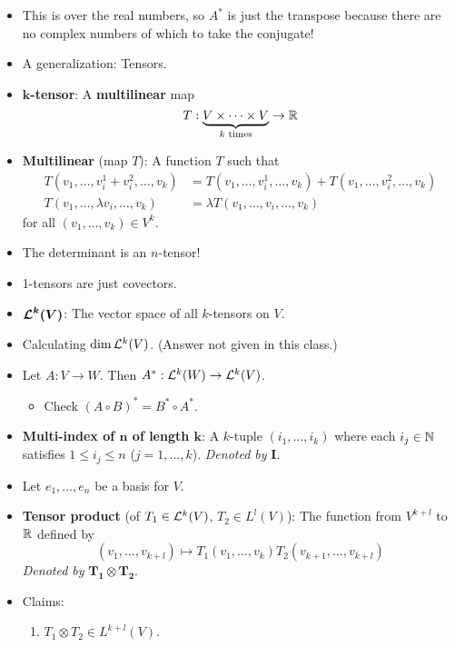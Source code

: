 \documentclass[../notes.tex]{subfiles}
\begin{document}
\begin{itemize}
    \item This is over the real numbers, so $A^*$ is just the transpose because there are no complex numbers of which to take the conjugate!
    \item A generalization: Tensors.
    \item \textbf{$\bm{k}$-tensor}: A \textbf{multilinear} map
    \begin{equation*}
        T:\underbrace{V\times\cdots\times V}_{k\text{ times}}\to\R
    \end{equation*}
    \item \textbf{Multilinear} (map $T$): A function $T$ such that
    \begin{align*}
        T(v_1,\dots,v_i^1+v_i^2,\dots,v_k) &= T(v_1,\dots,v_i^1,\dots,v_k)+T(v_1,\dots,v_i^2,\dots,v_k)\\
        T(v_1,\dots,\lambda v_i,\dots,v_k) &= \lambda T(v_1,\dots,v_i,\dots,v_k)
    \end{align*}
    for all $(v_1,\dots,v_k)\in V^k$.
    \item The determinant is an $n$-tensor!
    \item 1-tensors are just covectors.
    \item $\bm{\lin[k]{V}}$: The vector space of all $k$-tensors on $V$.
    \item Calculating $\dim \lin[k]{V}$. (Answer not given in this class.)
    \item Let $A:V\to W$. Then $A^*:\lin[k]{W}\to\lin[k]{V}$.
    \begin{itemize}
        \item Check $(A\circ B)^*=B^*\circ A^*$.
    \end{itemize}
    \item \textbf{Multi-index of $\bm{n}$ of length $\bm{k}$}: A $k$-tuple $(i_1,\dots,i_k)$ where each $i_j\in\N$ satisfies $1\leq i_j\leq n$ ($j=1,\dots,k$). \emph{Denoted by} $\bm{I}$.
    \item Let $e_1,\dots,e_n$ be a basis for $V$.
    \item \textbf{Tensor product} (of $T_1\in \lin[k]{V}$, $T_2\in L^l(V)$): The function from $V^{k+l}$ to $\R$ defined by
    \begin{equation*}
        (v_1,\dots,v_{k+l}) \mapsto T_1(v_1,\dots,v_k)T_2(v_{k+1},\dots,v_{k+l})
    \end{equation*}
    \emph{Denoted by} $\bm{T_1\otimes T_2}$.
    \item Claims:
    \begin{enumerate}
        \item $T_1\otimes T_2\in L^{k+l}(V)$.

\end{enumerate}
\end{itemize}
\end{document}
